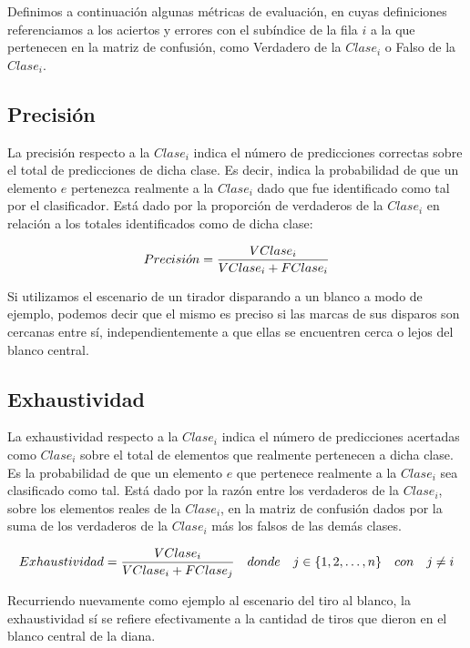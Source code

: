 {Definimos a continuaci\'on algunas m\'etricas de evaluaci\'on, en cuyas definiciones referenciamos a los aciertos y errores con el sub\'indice de la fila $i$ a la que pertenecen en la matriz de confusi\'on, como Verdadero de la $Clase_i$ o Falso de la $Clase_i$. 

\subsection{Precisi\'on}

La precisi\'on respecto a la $Clase_i$ indica el n\'umero de predicciones correctas sobre el total de predicciones de dicha clase. Es decir, indica la probabilidad de que un elemento $e$ pertenezca realmente a la $Clase_i$ dado que fue identificado como tal por el clasificador. Est\'a dado por la proporci\'on de verdaderos de la $Clase_i$ en relaci\'on a los totales identificados como de dicha clase:
\newline

$$ Precisi\acute{o}n = {V Clase_i \over V Clase_i + F Clase_i} $$ 
\newline

Si utilizamos el escenario de un tirador disparando a un blanco a modo de ejemplo, podemos decir que el mismo es preciso si las marcas de sus disparos son cercanas entre s\'i, independientemente a que ellas se encuentren cerca o lejos del blanco central.

\subsection{Exhaustividad}

La exhaustividad respecto a la $Clase_i$ indica el n\'umero de predicciones acertadas como $Clase_i$ sobre el total de elementos que realmente pertenecen a dicha clase. Es la probabilidad de que un elemento $e$ que pertenece realmente a la $Clase_i$ sea clasificado como tal. Est\'a dado por la raz\'on entre los verdaderos de la $Clase_i$, sobre los elementos reales de la $Clase_i$, en la matriz de confusi\'on dados por la suma de los verdaderos de la $Clase_i$ m\'as los falsos de las dem\'as clases.
\newline

$$ Exhaustividad = { V Clase_i \over V Clase_i + F Clase_j } \quad donde \quad j \in \lbrace 1,2,\dots,n \rbrace \quad con \quad j \ne i $$
\newline

Recurriendo nuevamente como ejemplo al escenario del tiro al blanco, la exhaustividad s\'i se refiere efectivamente a la cantidad de tiros que dieron en el blanco central de la diana.

}
